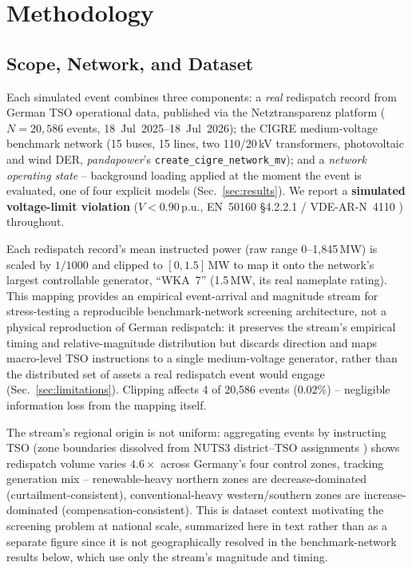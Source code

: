 \documentclass[11pt,conference]{IEEEtran}
\begin{document}

\section{Methodology}
\label{sec:methodology}

\subsection{Scope, Network, and Dataset}
\label{sec:scope}
Each simulated event combines three components: a \textit{real} redispatch record from German TSO
operational data, published via the Netztransparenz platform ($N=20{,}586$ events,
18~Jul~2025--18~Jul~2026); the CIGRE medium-voltage benchmark network \cite{ref:rudion2006} (15
buses, 15 lines, two 110/20\,kV transformers, photovoltaic and wind DER, \textit{pandapower}'s
\texttt{create\_cigre\_network\_mv}); and a \textit{network operating state} -- background loading
applied at the moment the event is evaluated, one of four explicit models (Sec.~\ref{sec:results}).
We report a \textbf{simulated voltage-limit violation} ($V<0.90$\,p.u., EN~50160 \S4.2.2.1 /
VDE-AR-N~4110 \cite{ref:vde_ar_n_4110}) throughout.

Each redispatch record's mean instructed power (raw range 0--1,845\,MW) is scaled by $1/1000$ and
clipped to $[0,1.5]$\,MW to map it onto the network's largest controllable generator, ``WKA~7''
(1.5\,MW, its real nameplate rating). This mapping provides an empirical event-arrival and magnitude
stream for stress-testing a reproducible benchmark-network screening architecture, not a physical
reproduction of German redispatch: it preserves the stream's empirical timing and relative-magnitude
distribution but discards direction and maps macro-level TSO instructions to a single medium-voltage
generator, rather than the distributed set of assets a real redispatch event would engage
(Sec.~\ref{sec:limitations}). Clipping affects 4 of 20,586 events (0.02\%) -- negligible information
loss from the mapping itself.

The stream's regional origin is not uniform: aggregating events by instructing TSO (zone boundaries
dissolved from NUTS3 district--TSO assignments \cite{ref:frysztacki2023}) shows redispatch volume
varies $4.6\times$ across Germany's four control zones, tracking generation mix -- renewable-heavy
northern zones are decrease-dominated (curtailment-consistent), conventional-heavy western/southern
zones are increase-dominated (compensation-consistent). This is dataset context motivating the
screening problem at national scale, summarized here in text rather than as a separate figure since
it is not geographically resolved in the benchmark-network results below, which use only the
stream's magnitude and timing.
\end{document}
